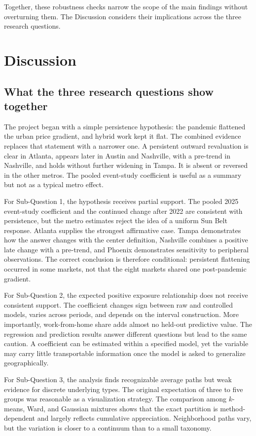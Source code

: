 \documentclass[11pt]{article}
\begin{document}
Together, these robustness checks narrow the scope of the main findings without overturning them. The Discussion considers their
implications across the three research questions.

\section{Discussion}

\subsection{What the three research questions show together}

The project began with a simple persistence hypothesis: the pandemic flattened the urban price gradient, and hybrid work kept it
flat. The combined evidence replaces that statement with a narrower one. A persistent outward revaluation is clear in Atlanta,
appears later in Austin and Nashville, with a pre-trend in Nashville, and holds without further widening in Tampa. It is absent or
reversed in the other metros.
The pooled event-study coefficient is useful as a summary but not as a typical metro effect.

For Sub-Question 1, the hypothesis receives partial support. The pooled 2025 event-study coefficient and the continued change after
2022 are consistent with persistence, but the metro estimates reject the idea of a uniform Sun Belt response. Atlanta supplies the
strongest affirmative case. Tampa demonstrates how the answer changes with the center definition, Nashville combines a positive
late change with a pre-trend, and Phoenix demonstrates sensitivity
to peripheral observations. The correct conclusion is therefore conditional: persistent flattening occurred in some markets, not
that the eight markets shared one post-pandemic gradient.

For Sub-Question 2, the expected positive exposure relationship does not receive consistent support. The coefficient changes sign between
raw and controlled models, varies across periods, and depends on the interval construction. More importantly, work-from-home share
adds almost no held-out predictive value. The regression and prediction results answer different questions but lead to the same
caution. A coefficient can be estimated within a specified model, yet the variable may carry little transportable information once
the model is asked to generalize geographically.

For Sub-Question 3, the analysis finds recognizable average paths but weak evidence for discrete underlying types. The original
expectation of three to five groups was reasonable as a visualization strategy. The comparison among $k$-means, Ward, and Gaussian
mixtures shows that the exact partition is method-dependent and largely reflects cumulative appreciation. Neighborhood paths vary,
but the variation is closer to a continuum than to a small taxonomy.
\end{document}
